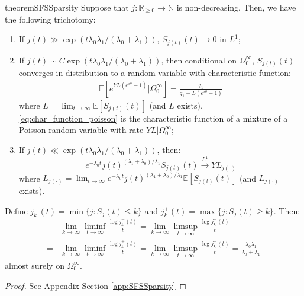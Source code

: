 \documentclass{article}
\numberwithin{equation}{section}
\begin{document}
\begin{restatable}{theorem}{SFSSparsity}\label{thm:SFSSparsity}
    Suppose that $j:\mathbb{R}_{\geq 0}\to \mathbb{N}$ is non-decreasing. Then, we have the following trichotomy:
    \begin{enumerate}
        \item If $j(t)\gg\exp(t\lambda_0\lambda_1/(\lambda_0+\lambda_1))$, $S_{j(t)}(t)\to 0$ in $L^1$;
        \item If $j(t)\sim C\exp(t\lambda_0\lambda_1/(\lambda_0+\lambda_1))$, then conditional on $\Omega_0^\infty$, $S_{j(t)}(t)$ converges in distribution to a random variable with characteristic function:
        \begin{align}
            \mathbb{E}[e^{YL(e^{i\theta}-1)}|\Omega_0^\infty]=\frac{q_1}{q_1-L\left(e^{i\theta}-1\right)}\label{eq:char_function_poisson}
        \end{align}
        where $L=\lim_{t\to\infty} \mathbb{E}[S_{j(t)}(t)]$ (and $L$ exists). \ref{eq:char_function_poisson} is the characteristic function of a mixture of a Poisson random variable with rate $YL|\Omega_0^\infty$;
        \item If $j(t)\ll\exp(t\lambda_0\lambda_1/(\lambda_0+\lambda_1))$, then:
        \[e^{-\lambda_0 t}j(t)^{(\lambda_1+\lambda_0)/\lambda_1}S_{j(t)}(t)\overset{L^1}{\to} YL_{j(\cdot)}\]
        where $L_{j(\cdot)}=\lim_{t\to\infty}e^{-\lambda_0 t}j(t)^{(\lambda_1+\lambda_0)/\lambda_1}\mathbb{E}\left[S_{j(t)}(t)\right]$ (and $L_{j(\cdot)}$ exists).
    \end{enumerate}
    Define $j_k^-(t)=\min\{j:S_j(t)\leq k\}$ and $j_k^+(t)=\max\{j:S_j(t)\geq k\}$. Then:
    \begin{align*}
        &\lim_{k\to\infty}\liminf_{t\to\infty}\frac{\log j_k^-(t)}{t}=\lim_{k\to\infty}\limsup_{t\to\infty}\frac{\log j_k^-(t)}{t}\\
        =&\lim_{k\to\infty}\liminf_{t\to\infty}\frac{\log j_k^+(t)}{t}=\lim_{k\to\infty}\limsup_{t\to\infty}\frac{\log j_k^+(t)}{t}=\frac{\lambda_0\lambda_1}{\lambda_0+\lambda_1}
    \end{align*}
    almost surely on $\Omega_0^\infty$.
\end{restatable}
\begin{proof}
  See Appendix Section \ref{app:SFSSparsity}
\end{proof}
\end{document}
